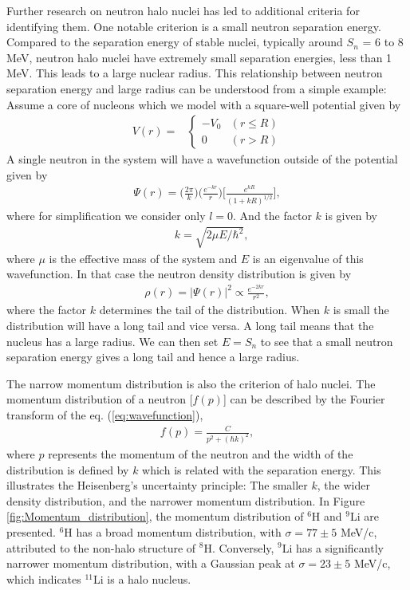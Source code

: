 Further research on neutron halo nuclei has led to additional criteria for identifying them. One notable criterion is a small neutron separation energy. Compared to the separation energy of stable nuclei, typically around $S_n$ = 6 to 8 MeV, neutron halo nuclei have extremely small separation energies, less than 1 MeV. This leads to a large nuclear radius. This relationship between neutron separation energy and large radius can be understood from a simple example: Assume a core of nucleons which we model with a square-well potential given by 
\begin{align}
    V(r) =& \left\{ \begin{array}{ll}
                   -V_0 & (r \leq R) \\
                   0 & (r > R)
                   \end{array}  \right .
 \end{align}
A single neutron in the system will have a wavefunction outside of the potential given by 
\begin{align}
    \Psi(r) = \bigg(\frac{2\pi}{k}\bigg)\bigg(\frac{e^{-k r}}{r}\bigg)\bigg[\frac{e^{k R}}{(1+ k R)^{1/2}}\bigg], \label{eq:wavefunction}
\end{align}
where for simplification we consider only $l=0$. And the factor $k$ is given by 
\begin{align}
    &k = \sqrt{2\mu E/\hbar^2},
\end{align}
where $\mu$ is the effective mass of the system and $E$ is an eigenvalue of this wavefunction. In that case the neutron density distribution is given by
\begin{align}
    \rho(r) = |\Psi(r)|^2 \propto \frac{e^{-2k r}}{r^2}, \label{eq:neutron_density_distribution}
\end{align}
where the factor $k$ determines the tail of the distribution. When $k$ is small the distribution will have a long tail and vice versa. A long tail means that the nucleus has a large radius. We can then set $E = S_n$ to see that a small neutron separation energy gives a long tail and hence a large radius.

The narrow momentum distribution is also the criterion of halo nuclei. The momentum distribution of a neutron [$f (p)$] can be described by the Fourier transform of the eq. (\ref{eq:wavefunction}),
\begin{align}
    f(p) = \frac{C}{p^2+(\hbar k)^2},
\end{align}
where $p$ represents the momentum of the neutron and the width of the distribution is defined by $k$ which is related with the separation energy. This illustrates the Heisenberg's uncertainty principle: The smaller $k$, the wider density distribution, and the narrower momentum distribution. In Figure \ref{fig:Momentum_distribution}, the momentum distribution of $^{6}$H and $^{9}$Li are presented. $^{6}$H has a broad momentum distribution, with $\sigma = 77 \pm 5$ MeV/c, attributed to the non-halo structure of $^{8}$H. Conversely, $^{9}$Li has a significantly narrower momentum distribution, with a Gaussian peak at $\sigma  = 23 \pm 5$ MeV/c, which indicates $^{11}$Li is a halo nucleus.

